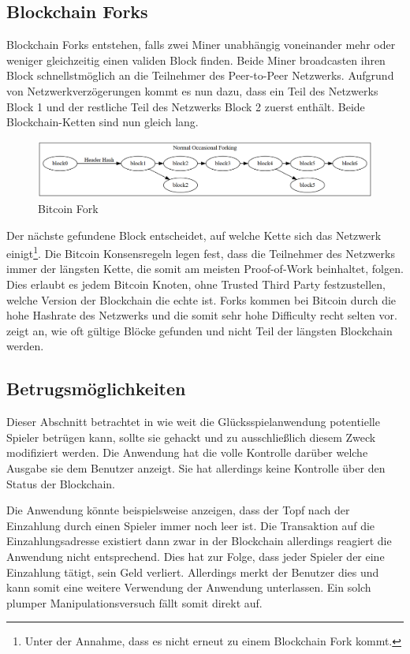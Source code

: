 \subsection{Blockchain Forks} \label{sssec:btc_fork}
Blockchain Forks entstehen, falls zwei Miner unabhängig voneinander mehr oder weniger gleichzeitig einen validen Block finden. Beide Miner broadcasten ihren Block schnellstmöglich an die Teilnehmer des Peer-to-Peer Netzwerks. Aufgrund von Netzwerkverzögerungen kommt es nun dazu, dass ein Teil des Netzwerks Block 1 und der restliche Teil des Netzwerks Block 2 zuerst enthält. Beide Blockchain-Ketten sind nun gleich lang.
\begin{figure}[H]
\centering
\includegraphics[width=1\linewidth]{Figures/btc/fork_normal}
\decoRule
\caption{Bitcoin Fork}
\label{fig:fork_normal}
\end{figure}
Der nächste gefundene Block entscheidet, auf welche Kette sich das Netzwerk einigt\footnote{Unter der Annahme, dass es nicht erneut zu einem Blockchain Fork kommt.}. Die Bitcoin Konsensregeln legen fest, dass die Teilnehmer des Netzwerks immer der längsten Kette, die somit am meisten Proof-of-Work beinhaltet, folgen. Dies erlaubt es jedem Bitcoin Knoten, ohne Trusted Third Party festzustellen, welche Version der Blockchain die echte ist. Forks kommen bei Bitcoin durch die hohe Hashrate des Netzwerks und die somit sehr hohe Difficulty recht selten vor. \cite{orphaned-blocks} zeigt an, wie oft gültige Blöcke gefunden und nicht Teil der längsten Blockchain werden.

\subsection{Betrugsmöglichkeiten}

Dieser Abschnitt betrachtet in wie weit die Glücksspielanwendung potentielle Spieler betrügen kann, sollte sie gehackt und zu ausschließlich diesem Zweck modifiziert werden.
Die Anwendung hat die volle Kontrolle darüber welche Ausgabe sie dem Benutzer anzeigt. Sie hat allerdings keine Kontrolle über den Status der Blockchain. 

Die Anwendung könnte beispielsweise anzeigen, dass der Topf nach der Einzahlung durch einen Spieler immer noch leer ist. Die Transaktion auf die Einzahlungsadresse existiert dann zwar in der Blockchain allerdings reagiert die Anwendung nicht entsprechend. Dies hat zur Folge, dass jeder Spieler der eine Einzahlung tätigt, sein Geld verliert. Allerdings merkt der Benutzer dies und kann somit eine weitere Verwendung der Anwendung unterlassen. Ein solch plumper Manipulationsversuch fällt somit direkt auf.

